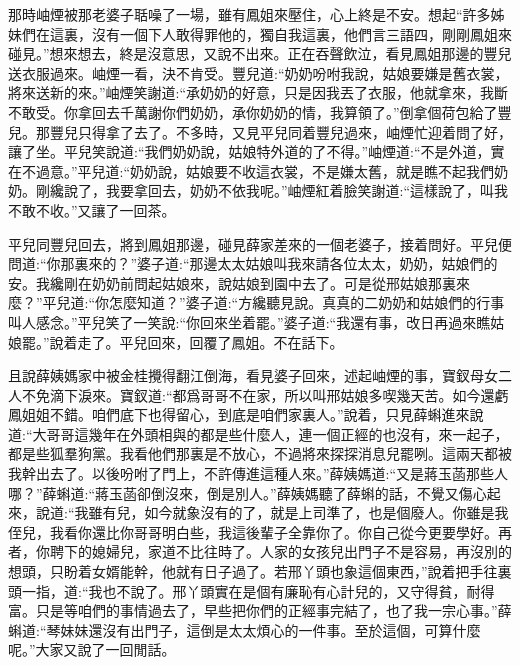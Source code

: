 \begin{parag}
    那時岫煙被那老婆子聒噪了一場，雖有鳳姐來壓住，心上終是不安。想起“許多姊妹們在這裏，沒有一個下人敢得罪他的，獨自我這裏，他們言三語四，剛剛鳳姐來碰見。”想來想去，終是沒意思，又說不出來。正在吞聲飲泣，看見鳳姐那邊的豐兒送衣服過來。岫煙一看，決不肯受。豐兒道:“奶奶吩咐我說，姑娘要嫌是舊衣裳，將來送新的來。”岫煙笑謝道:“承奶奶的好意，只是因我丟了衣服，他就拿來，我斷不敢受。你拿回去千萬謝你們奶奶，承你奶奶的情，我算領了。”倒拿個荷包給了豐兒。那豐兒只得拿了去了。不多時，又見平兒同着豐兒過來，岫煙忙迎着問了好，讓了坐。平兒笑說道:“我們奶奶說，姑娘特外道的了不得。”岫煙道:“不是外道，實在不過意。”平兒道:“奶奶說，姑娘要不收這衣裳，不是嫌太舊，就是瞧不起我們奶奶。剛纔說了，我要拿回去，奶奶不依我呢。”岫煙紅着臉笑謝道:“這樣說了，叫我不敢不收。”又讓了一回茶。
\end{parag}


\begin{parag}
    平兒同豐兒回去，將到鳳姐那邊，碰見薛家差來的一個老婆子，接着問好。平兒便問道:“你那裏來的？”婆子道:“那邊太太姑娘叫我來請各位太太，奶奶，姑娘們的安。我纔剛在奶奶前問起姑娘來，說姑娘到園中去了。可是從邢姑娘那裏來麼？”平兒道:“你怎麼知道？”婆子道:“方纔聽見說。真真的二奶奶和姑娘們的行事叫人感念。”平兒笑了一笑說:“你回來坐着罷。”婆子道:“我還有事，改日再過來瞧姑娘罷。”說着走了。平兒回來，回覆了鳳姐。不在話下。
\end{parag}


\begin{parag}
    且說薛姨媽家中被金桂攪得翻江倒海，看見婆子回來，述起岫煙的事，寶釵母女二人不免滴下淚來。寶釵道:“都爲哥哥不在家，所以叫邢姑娘多喫幾天苦。如今還虧鳳姐姐不錯。咱們底下也得留心，到底是咱們家裏人。”說着，只見薛蝌進來說道:“大哥哥這幾年在外頭相與的都是些什麼人，連一個正經的也沒有，來一起子，都是些狐羣狗黨。我看他們那裏是不放心，不過將來探探消息兒罷咧。這兩天都被我幹出去了。以後吩咐了門上，不許傳進這種人來。”薛姨媽道:“又是蔣玉菡那些人哪？”薛蝌道:“蔣玉菡卻倒沒來，倒是別人。”薛姨媽聽了薛蝌的話，不覺又傷心起來，說道:“我雖有兒，如今就象沒有的了，就是上司準了，也是個廢人。你雖是我侄兒，我看你還比你哥哥明白些，我這後輩子全靠你了。你自己從今更要學好。再者，你聘下的媳婦兒，家道不比往時了。人家的女孩兒出門子不是容易，再沒別的想頭，只盼着女婿能幹，他就有日子過了。若邢丫頭也象這個東西，”說着把手往裏頭一指，道:“我也不說了。邢丫頭實在是個有廉恥有心計兒的，又守得貧，耐得富。只是等咱們的事情過去了，早些把你們的正經事完結了，也了我一宗心事。”薛蝌道:“琴妹妹還沒有出門子，這倒是太太煩心的一件事。至於這個，可算什麼呢。”大家又說了一回閒話。
\end{parag}


